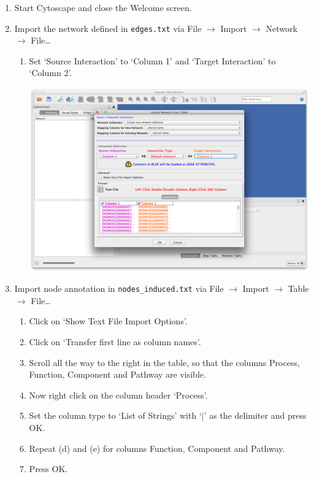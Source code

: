 \documentclass[a4paper,11pt]{article}
\begin{document}
\begin{enumerate}
  \item Start Cytoscape and close the Welcome screen.
  \item Import the network defined in \texttt{edges.txt} via File $\rightarrow$
    Import $\rightarrow$ Network $\rightarrow$ File\ldots
  \begin{enumerate}
    \item Set `Source Interaction' to `Column 1' and `Target Interaction' to
      `Column 2'.
      \begin{center}
        \includegraphics[width=.9\textwidth]{images/1.png}
      \end{center}
    \end{enumerate}
  \item Import node annotation in \texttt{nodes\_induced.txt} via File
    $\rightarrow$ Import $\rightarrow$ Table $\rightarrow$ File\ldots
    \begin{enumerate}
      \item Click on `Show Text File Import Options'.
      \item Click on `Transfer first line as column names'.
      \item Scroll all the way to the right in the table, so that the columns
        Process, Function, Component and Pathway are visible.
      \item Now right click on the column header `Process'.
      \item Set the column type to `List of Strings' with `$|$' as the delimiter
        and press OK.
      \item Repeat (d) and (e) for columns Function, Component and Pathway.
      \item Press OK.
        \begin{center}

\end{center}
\end{enumerate}
\end{enumerate}
\end{document}
